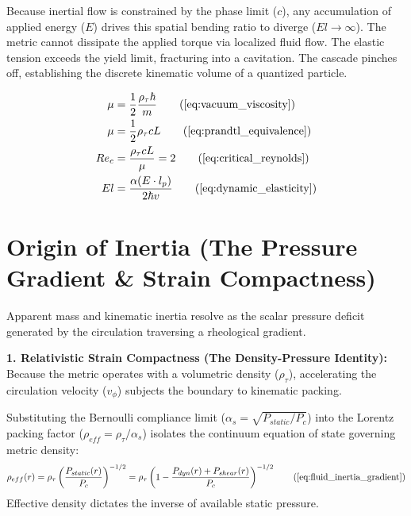 Because inertial flow is constrained by the phase limit ($c$), any accumulation of applied energy ($E$) drives this spatial bending ratio to diverge ($El \to \infty$). The metric cannot dissipate the applied torque via localized fluid flow. The elastic tension exceeds the yield limit, fracturing into a cavitation. The cascade pinches off, establishing the discrete kinematic volume of a quantized particle.

\begin{tcolorbox}[recallbox, title={\ref{box:ns_reg}. Navier-Stokes Regularization}]
\begin{align}
    \mu &= \frac{1}{2} \frac{\rho_{\tau} \hbar}{m} \tag{\ref{eq:vacuum_viscosity}} \\
    \mu &= \frac{1}{2} \rho_{\tau} c L \tag{\ref{eq:prandtl_equivalence}} \\
    Re_c &= \frac{\rho_{\tau} c L}{\mu} = 2 \tag{\ref{eq:critical_reynolds}} \\
    El &= \frac{\alpha (E \cdot l_p)}{2 \hbar v} \tag{\ref{eq:dynamic_elasticity}}
\end{align}
\end{tcolorbox}

\section{Origin of Inertia (The Pressure Gradient \& Strain Compactness)}
\label{sec:deriv_fluid_inertia}

Apparent mass and kinematic inertia resolve as the scalar pressure deficit generated by the circulation traversing a rheological gradient. 

\textbf{1. Relativistic Strain Compactness (The Density-Pressure Identity):} \\
Because the metric operates with a volumetric density ($\rho_{\tau}$), accelerating the circulation velocity ($v_\phi$) subjects the boundary to kinematic packing. 

Substituting the Bernoulli compliance limit ($\alpha_s = \sqrt{P_{static}/P_c}$) into the Lorentz packing factor ($\rho_{eff} = \rho_{\tau} / \alpha_s$) isolates the continuum equation of state governing metric density: 
\begin{equation}
    \rho_{eff}(r) = \rho_{\tau} \left( \frac{P_{static}(r)}{P_c} \right)^{-1/2} = \rho_{\tau} \left( 1 - \frac{P_{dyn}(r) + P_{shear}(r)}{P_c} \right)^{-1/2} \tag{\ref{eq:fluid_inertia_gradient}}
\end{equation}
Effective density dictates the inverse of available static pressure. 

